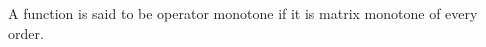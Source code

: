 \documentclass[12pt]{article}
\begin{document}
A function is said to be operator monotone if it is matrix monotone of every order.
\end{document}
